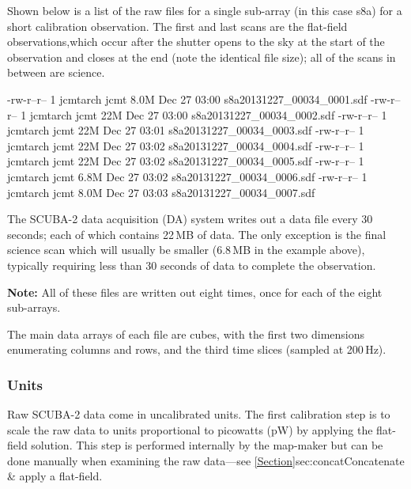 \documentclass[11pt,oneside,chapters]{starlink}
\begin{document}
Shown below is a list of the raw files for a single sub-array (in this
case s8a) for a short calibration observation. The first and last scans
are the flat-field observations,which occur after the shutter opens to
the sky at the start of the observation and closes at the end (note the
identical file size); all of the scans in between are science.


\begin{terminalv}
\end{terminalv}

\begin{terminalv}
-rw-r--r-- 1 jcmtarch jcmt 8.0M Dec 27 03:00 s8a20131227_00034_0001.sdf
-rw-r--r-- 1 jcmtarch jcmt  22M Dec 27 03:00 s8a20131227_00034_0002.sdf
-rw-r--r-- 1 jcmtarch jcmt  22M Dec 27 03:01 s8a20131227_00034_0003.sdf
-rw-r--r-- 1 jcmtarch jcmt  22M Dec 27 03:02 s8a20131227_00034_0004.sdf
-rw-r--r-- 1 jcmtarch jcmt  22M Dec 27 03:02 s8a20131227_00034_0005.sdf
-rw-r--r-- 1 jcmtarch jcmt 6.8M Dec 27 03:02 s8a20131227_00034_0006.sdf
-rw-r--r-- 1 jcmtarch jcmt 8.0M Dec 27 03:03 s8a20131227_00034_0007.sdf
\end{terminalv}

The SCUBA-2 data acquisition (DA) system writes out a data file every
30 seconds; each of which contains 22\,MB of data. The only exception
is the final science scan which will usually be smaller (6.8\,MB in
the example above), typically requiring less than 30 seconds of data
to complete the observation.

\textbf{Note:} All of these files are written out eight times, once
for each of the eight sub-arrays.

The main data arrays of each file are cubes, with the first two
dimensions enumerating columns and rows, and the third time slices
(sampled at 200\,Hz).

\subsubsection{Units}%

Raw SCUBA-2 data come in uncalibrated units. The first calibration
step is to scale the raw data to units proportional to picowatts (pW)
by applying the flat-field solution. This step is performed internally
 by the map-maker but can be done manually when examining the raw data---see
\cref{Section}{sec:concat}{Concatenate \& apply a flat-field}.
\end{document}
